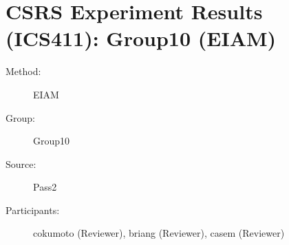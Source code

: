 \chapter {CSRS Experiment Results (ICS411): Group10 (EIAM)}
\small
	  

\begin{description}
\item [Method:] EIAM
\item [Group:] Group10
\item [Source:] Pass2
\item [Participants:] cokumoto (Reviewer), briang (Reviewer), casem (Reviewer)
\end{description}
